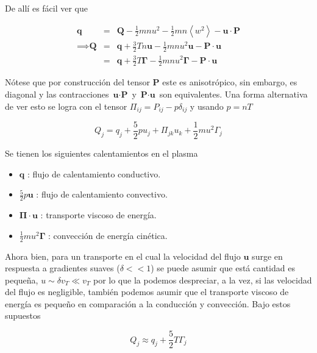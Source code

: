 \documentclass[11pt]{article}
\theoremstyle{definition}
\begin{document}
  De all\'i es f\'acil ver que 

  \begin{eqnarray}
    \textbf{q} &=& \textbf{Q} -\frac{1}{2}mnu^2 - \frac{1}{2}mn\left<w^2\right> - \textbf{u}\cdot\textbf{P}\nonumber\\
    \implies \textbf{Q} &=& \textbf{q} + \frac{3}{2}Tn\textbf{u} - \frac{1}{2}mnu^2\textbf{u} - \textbf{P}\cdot\textbf{u}\nonumber \\
                        &=& \textbf{q} + \frac{3}{2}T\pmb{\Gamma} - \frac{1}{2}mnu^2\pmb{\Gamma} - \textbf{P}\cdot\textbf{u}
  \end{eqnarray}

  N\'otese que por construcci\'on del tensor $\textbf{P}$ este es anisotr\'opico, sin embargo, es diagonal y las contracciones $\textbf{u}\cdot\textbf{P}$ y $\textbf{P}\cdot\textbf{u}$ son equivalentes. Una forma alternativa de ver esto se logra con el tensor $\Pi_{ij} = P_{ij} - p\delta_{ij}$ y usando $p = nT$ 

  \begin{equation}
    Q_j = q_j + \frac{5}{2}pu_j + \Pi_{jk}u_k + \frac{1}{2}mu^2\Gamma_j
  \end{equation}

  Se tienen los siguientes calentamientos en el plasma\cite{helander2005}

  \begin{itemize}
    \item $\textbf{q}$ : flujo de calentamiento conductivo.
    \item $\frac{5}{2}p\textbf{u}$ : flujo de calentamiento convectivo.
    \item $\pmb{\Pi}\cdot\textbf{u}$ : transporte viscoso de energ\'ia.
    \item $\frac{1}{2}mu^2\pmb{\Gamma}$ : convecci\'on de energ\'ia cin\'etica.
  \end{itemize}

Ahora bien, para un transporte en el cual la velocidad del flujo $\textbf{u}$ surge en respuesta a gradientes suaves ($\delta << 1$) se puede asumir que est\'a cantidad es pequeña, $u \sim \delta v_T \ll v_T$ por lo que la podemos despreciar, a la vez, si las velocidad del flujo es negligible, tambi\'en podemos asumir que el transporte viscoso de energ\'ia es pequeño en comparaci\'on a la conducci\'on y convecci\'on. Bajo estos supuestos\cite{dinklage2005}

  \begin{equation*}
    Q_j \approx q_j + \frac{5}{2}T\Gamma_j
  \end{equation*}
\end{document}

